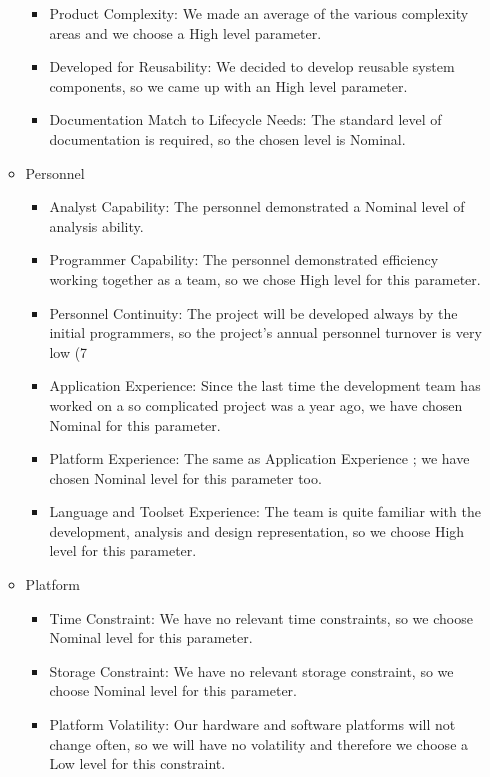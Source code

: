\begin{itemize}
\begin{itemize}
\begin{itemize}
          \item Product Complexity: We made an average of the various complexity areas and we choose a High level parameter.
          \item Developed for Reusability:  We decided to develop reusable system components, so we came up with an High level parameter.
          \item Documentation Match to Lifecycle Needs: The standard level of documentation is required, so the chosen level is Nominal.
        \end{itemize}
      \item Personnel
        \begin{itemize}
          \item Analyst Capability: The personnel demonstrated a Nominal level of analysis ability.
          \item Programmer Capability: The personnel demonstrated efficiency working together as a team, so we chose High level for this  parameter.
          \item Personnel Continuity: The project will be developed always by the initial programmers, so the project’s annual personnel turnover is very low (7 %
          \item Application Experience: Since the last time the development team has worked on a so complicated project was a year ago, we have chosen Nominal for this parameter.
          \item Platform Experience: The same as Application Experience ; we have chosen Nominal level for this parameter too.
          \item Language and Toolset Experience: The team is quite familiar with the development, analysis and design representation, so we choose High level for this parameter.
        \end{itemize}
      \item Platform
        \begin{itemize}
          \item Time Constraint: We have no relevant time constraints, so we choose Nominal level for this parameter.
          \item Storage Constraint: We have no relevant storage constraint, so we choose Nominal level for this parameter.
          \item Platform Volatility: Our hardware and software platforms will not change often, so we will have  no volatility and therefore we choose a Low level for this  constraint.

\end{itemize}
\end{itemize}
\end{itemize}
